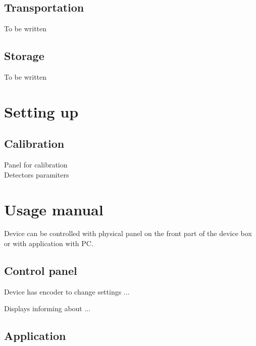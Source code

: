 \documentclass[twoside, 12pt, a4paper]{refart}
\begin{document}
\subsection{Transportation}

To be written

\subsection{Storage}

To be written

\newpage
\section{Setting up}
\label{setup}


\subsection{Calibration}
 
\begin{description}

\item[Panel for calibration]
        
\item[Detectors paramiters]
        

\end{description}


\newpage
\section{Usage manual}
\label{usage}

Device can be controlled with physical panel on the front part of the device box or with application with PC.

\subsection{Control panel}

 Device has encoder to change settings ...

 Displays informing about  ...


\subsection{Application}
\end{document}
